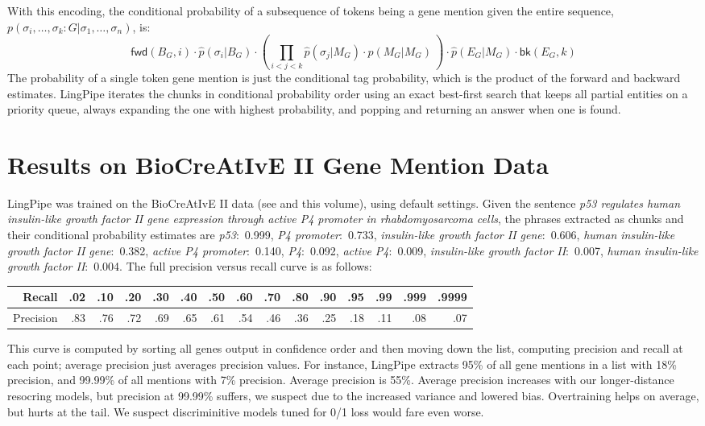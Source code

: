 \documentclass[twoside,11pt]{article}
\begin{document}
With this encoding, the conditional probability of a subsequence
of tokens being a gene mention given the entire sequence,
$p(\sigma_i,\ldots,\sigma_{k}:G | \sigma_1,\ldots,\sigma_n)$, is:
\[
\mathsf{fwd}(B_G,i)
  \cdot
  \hat{p}(\sigma_i | B_G)
  \cdot
  ( \prod_{i < j < k} \hat{p}(\sigma_{j} | M_G) \cdot \hat{p}(M_G|M_G) \ )
  \cdot
  \hat{p}(E_G|M_G)
  \cdot
  \mathsf{bk}(E_G,k)
\]
The probability of a single token gene mention is just the conditional
tag probability, which is the product of the forward and backward
estimates.  LingPipe iterates the chunks in conditional probability
order using an exact best-first search that keeps all partial entities
on a priority queue, always expanding the one with highest
probability, and popping and returning an answer when one is found.

\section{Results on BioCreAtIvE II Gene Mention Data}

LingPipe was trained on the BioCreAtIvE II data (see \cite{genetag}
and this volume), using default settings.  Given the sentence
{\small\it p53 regulates human insulin-like growth factor II gene
expression through active P4 promoter in rhabdomyosarcoma cells}, the
phrases extracted as chunks and their conditional probability
estimates are {\small\it p53}:~0.999, {\small\it P4 promoter}:~0.733,
{\small\it insulin-like growth factor II gene}:~0.606, {\small\it human
insulin-like growth factor II gene}:~0.382, {\small\it active P4
promoter}:~0.140, {\small\it P4}:~0.092, {\small\it active P4}:~0.009,
{\small\it insulin-like growth factor II}:~0.007, {\small\it human
insulin-like growth factor II}:~0.004.  The full precision versus recall
curve is as follows:
%
\begin{center}
\small
\begin{tabular}{|r||r|r|r|r|r|r|r|r|r|r|r|r|r|r|}
\hline
Recall & .02 & .10 & .20 & .30 & .40 & .50 & .60 & .70 & .80 & .90
       & .95 & .99 & .999 & .9999
\\ \hline
Precision & .83 & .76 & .72 & .69 & .65 & .61 & .54 & .46 & .36
          & .25 & .18 & .11 & .08 & .07
\\ \hline
\end{tabular}
\end{center}
%
This curve is computed by sorting all genes output in confidence order
and then moving down the list, computing precision and recall at each
point; average precision just averages precision values.  For
instance, LingPipe extracts 95\% of all gene mentions in a list with
18\% precision, and 99.99\% of all mentions with 7\% precision.
Average precision is 55\%.  Average precision increases with our
longer-distance resocring models, but precision at 99.99\% suffers, we
suspect due to the increased variance and lowered bias.  Overtraining
helps on average, but hurts at the tail.  We suspect discriminitive
models tuned for 0/1 loss would fare even worse.
\end{document}
